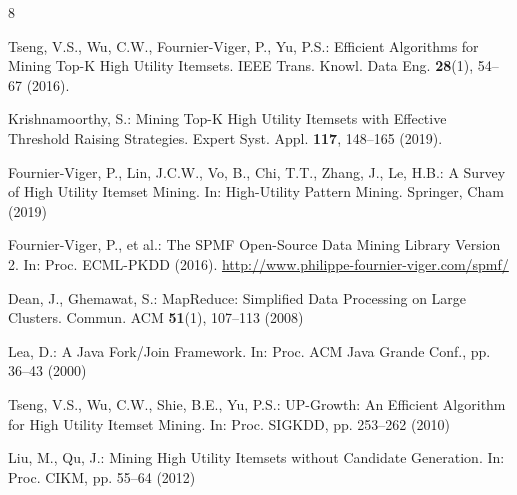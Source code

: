 \documentclass[runningheads]{llncs}
\begin{document}
\begin{thebibliography}{8}

Tseng, V.S., Wu, C.W., Fournier-Viger, P., Yu, P.S.: Efficient Algorithms for Mining Top-K High Utility Itemsets. IEEE Trans. Knowl. Data Eng. \textbf{28}(1), 54--67 (2016). 

Krishnamoorthy, S.: Mining Top-K High Utility Itemsets with Effective Threshold Raising Strategies. Expert Syst. Appl. \textbf{117}, 148--165 (2019). 

Fournier-Viger, P., Lin, J.C.W., Vo, B., Chi, T.T., Zhang, J., Le, H.B.: A Survey of High Utility Itemset Mining. In: High-Utility Pattern Mining. Springer, Cham (2019)

Fournier-Viger, P., et al.: The SPMF Open-Source Data Mining Library Version 2. In: Proc. ECML-PKDD (2016). \url{http://www.philippe-fournier-viger.com/spmf/}

Dean, J., Ghemawat, S.: MapReduce: Simplified Data Processing on Large Clusters. Commun. ACM \textbf{51}(1), 107--113 (2008)

Lea, D.: A Java Fork/Join Framework. In: Proc. ACM Java Grande Conf., pp. 36--43 (2000)

Tseng, V.S., Wu, C.W., Shie, B.E., Yu, P.S.: UP-Growth: An Efficient Algorithm for High Utility Itemset Mining. In: Proc. SIGKDD, pp. 253--262 (2010)

Liu, M., Qu, J.: Mining High Utility Itemsets without Candidate Generation. In: Proc. CIKM, pp. 55--64 (2012)

\end{thebibliography}
\end{document}
